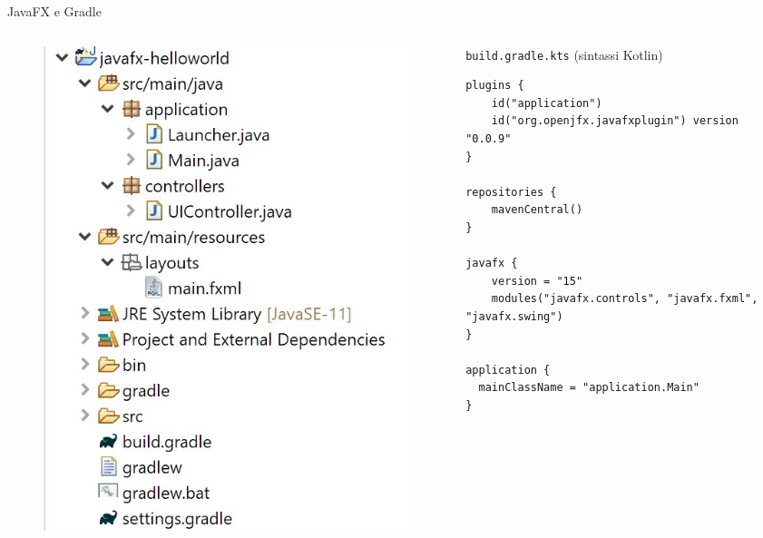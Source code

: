 \documentclass[presentation]{beamer}
\begin{document}
\begin{frame}[fragile]{JavaFX e Gradle}
\begin{columns}[t]
\begin{column}{0.3\textwidth}
\begin{figure}
\includegraphics[width=\textwidth]{img/javafx-gradle-project.png}
\end{figure}
\end{column}
\begin{column}{0.7\textwidth}
\begin{block}{\texttt{build.gradle.kts} (sintassi Kotlin)}

\begin{lstlisting}[basicstyle=\tiny]
plugins {
    id("application")
    id("org.openjfx.javafxplugin") version "0.0.9"
}

repositories {
    mavenCentral()
}

javafx {
    version = "15"
    modules("javafx.controls", "javafx.fxml", "javafx.swing")
}

application {
  mainClassName = "application.Main"
}
\end{lstlisting}

\end{block}
\end{column}
\end{columns}
\end{frame}
\end{document}
